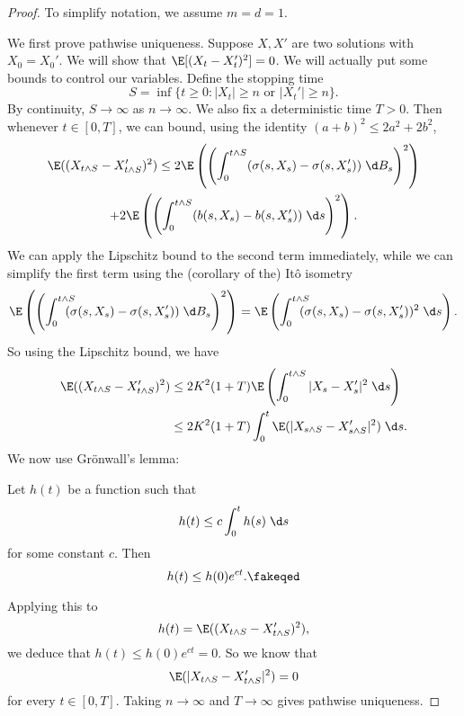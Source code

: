 \documentclass[a4paper]{article}
\begin{document}
\begin{proof}
  To simplify notation, we assume $m = d = 1$.

  We first prove pathwise uniqueness. Suppose $X, X'$ are two solutions with $X_0 = X_0'$. We will show that $\E[(X_t - X_t')^2] = 0$. We will actually put some bounds to control our variables. Define the stopping time
  \[
    S = \inf \{t \geq 0: |X_t| \geq n\text{ or }|X_t'| \geq n\}.
  \]
  By continuity, $S \to \infty$ as $n \to \infty$. We also fix a deterministic time $T > 0$. Then whenever $t \in [0, T]$, we can bound, using the identity $(a + b)^2 \leq 2a^2 + 2b^2$,
  \begin{multline*}
    \E ((X_{t \wedge S} - X'_{t \wedge S})^2) \leq 2 \E \left(\left(\int_0^{t \wedge S} (\sigma(s, X_s) - \sigma(s, X_s'))\;\d B_s\right)^2\right) \\
    + 2 \E \left(\left(\int_0^{t \wedge S} (b(s, X_s) - b(s, X_s'))\;\d s\right)^2 \right).
  \end{multline*}
  We can apply the Lipschitz bound to the second term immediately, while we can simplify the first term using the (corollary of the) It\^o isometry
  \[
    \E \left(\left(\int_0^{t \wedge S}\!\!\!\!\!(\sigma(s, X_s) - \sigma(s, X_s'))\;\d B_s\right)^2\right) = \E \left(\int_0^{t \wedge S}\!\!\!\!\!(\sigma(s, X_s) - \sigma(s, X_s'))^2\;\d s\right).
  \]
  So using the Lipschitz bound, we have
  \begin{align*}
    \E ((X_{t \wedge S} - X'_{t \wedge S})^2) &\leq 2K^2 (1 + T) \E \left(\int_0^{t \wedge S} |X_s - X_s'|^2 \;\d s\right)\\
    &\leq 2K^2 (1 + T) \int_0^t \E (|X_{s \wedge S} - X'_{s \wedge S}|^2)\;\d s.
  \end{align*}
  We now use Gr\"onwall's lemma:
  \begin{lemma}
    Let $h(t)$ be a function such that
    \[
      h(t) \leq c \int_0^t h(s)\;\d s
    \]
    for some constant $c$. Then
    \[
      h(t) \leq h(0) e^{ct}.\fakeqed
    \]
  \end{lemma}
  Applying this to
  \[
    h(t) = \E((X_{t \wedge S} - X_{t \wedge S}')^2),
  \]
  we deduce that $h(t) \leq h(0) e^{ct} = 0$. So we know that
  \[
    \E(|X_{t \wedge S} - X_{t \wedge S}'|^2) = 0
  \]
  for every $t \in [0, T]$. Taking $n \to \infty$ and $T \to \infty$ gives pathwise uniqueness.


\end{proof}
\end{document}
